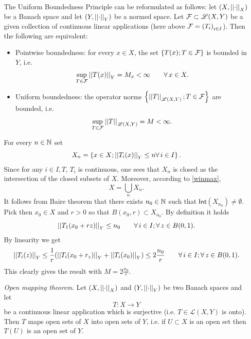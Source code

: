 \documentclass{article}
\begin{document}
The Uniform Boundedness Principle can be reformulated as follows: let $\left(X,\left|\left|\cdot\right|\right|_{X}\right)$ be a Banach space and let $\left(Y,\left|\left|\cdot\right|\right|_{Y}\right)$ be a normed space. Let $\mathcal{F}\subset\mathscr{L}(X,Y)$ be a given collection of continuous linear applications (here above $\mathcal{F}={\left(T_{i}\right)}_{i\in I}$). Then the following are equivalent:
\begin{itemize}
	\item Pointwise boundedness: for every $x\in X$, the set $\left\{T(x);T\in\mathcal{F}\right\}$ is bounded in $Y$, i.e.
	\begin{equation*}
		\sup_{T\in\mathcal{F}}\left|\left|T(x)\right|\right|_{Y}=M_{x}<\infty\qquad\forall\, x\in X.
	\end{equation*}
	\item Uniform boundedness: the operator norms $\left\{\left|\left|T\right|\right|_{\mathscr{L}(X,Y)};T\in\mathcal{F}\right\}$ are bounded, i.e.
	\begin{equation*}
		\sup_{T\in\mathcal{F}}\left|\left|T\right|\right|_{\mathscr{L}(X,Y)}=M<\infty.
	\end{equation*}
\end{itemize}
\begin{fancyproof}
	For every $n\in\mathbb{N}$ set
	\begin{equation*}
		X_{n}=\left\{x\in X;\left|\left|T_{i}(x)\right|\right|_{Y}\leq n\forall\, i\in I\right\}.
	\end{equation*}
	Since for any $i\in I,T$, $T_{i}$ is continuous, one sees that $X_{n}$ is closed as the intersection of the closed subsets of $X$. Moreover, according to \ref{winmax},
	\begin{equation*}
		X=\bigcup_{n}X_{n}.
	\end{equation*}
	It follows from Baire theorem that there exists $n_{0}\in\mathbb{N}$ such that $\mathsf{Int}\left(X_{n_{0}}\right)\neq\emptyset$. Pick then $x_{0}\in X$ and $r>0$ so that $B(x_{0},r)\subset X_{n_{0}}$. By definition it holds
	\begin{equation*}
		\left|\left|T_{1}(x_{0}+rz)\right|\right|_{Y}\leq n_{0}\qquad\forall\, i\in I;\forall\, z\in B(0,1).
	\end{equation*}
	By linearity we get
	\begin{equation*}
		\left|\left|T_{i}(z)\right|\right|_{Y}\leq\frac{1}{r}(\left|\left|T_{i}(x_{0}+r_{z})\right|\right|_{Y}+\left|\left|T_{i}(x_{0})\right|\right|_{Y})\leq 2\frac{n_{0}}{r}\qquad\forall\, i\in I;\forall\, z\in B(0,1).
	\end{equation*}
	This clearly gives the result with $M=2\frac{n_{0}}{r}$.
\end{fancyproof}
\begin{theorem}
	\emph{Open mapping theorem}. Let $\left(X,\left|\left|\cdot\right|\right|_{X}\right)$ and $\left(Y,\left|\left|\cdot\right|\right|_{Y}\right)$ be two Banach spaces and let 
	\begin{equation*}
		T:X\to Y
	\end{equation*}
	be a continuous linear application which is surjective (i.e. $T\in\mathscr{L}(X,Y)$ is onto). Then $T$ maps open sets of $X$ into open sets of $Y$, i.e. if $U\subset X$ is an open set then $T(U)$ is an open set of $Y$.
\end{theorem}
\end{document}
